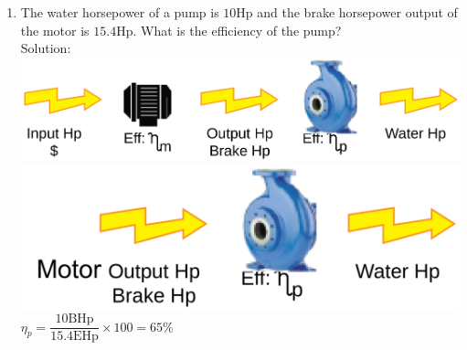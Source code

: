 \documentclass{article}
\begin{document}
\begin{enumerate}
\item The water horsepower of a pump is $10 \mathrm{Hp}$ and the brake horsepower output of the motor is $15.4 \mathrm{Hp}$. What is the efficiency of the pump?\\
  \vspace{0.2cm}
Solution:\\ 
 \vspace{0.2cm}
 \vspace{0.4cm}\includegraphics[scale=0.08]{PumpProblem}\\
 \vspace{0.2cm}
 \includegraphics[scale=0.32]{PumpingProblemPump}
 $\eta_p=\dfrac{10 \mathrm{BHp}}{15.4 \mathrm{EHp}} \times 100=\boxed{65 \%}$
 \vspace{0.2cm}


\end{enumerate}
\end{document}
